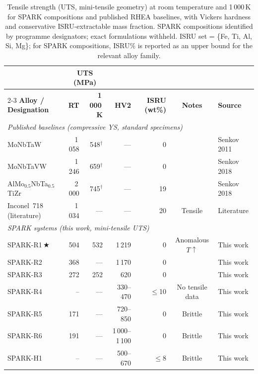 \documentclass[11pt,a4paper]{article}
\begin{document}
\begin{landscape}
\begin{table}[p]
\centering
\caption{Tensile strength (UTS, mini-tensile geometry) at room temperature and 1\,000\,K for SPARK compositions and published RHEA baselines, with Vickers hardness and conservative ISRU-extractable mass fraction. SPARK compositions identified by programme designators; exact formulations withheld. ISRU set = \{Fe, Ti, Al, Si, Mg\}; for SPARK compositions, ISRU\% is reported as an upper bound for the relevant alloy family.}
\label{tab:ys_comparison}
\footnotesize
\begin{tabular}{lrrrrcl}
\toprule
& \multicolumn{2}{c}{\textbf{UTS (MPa)}} & & & & \\
\cmidrule(lr){2-3}
\textbf{Alloy / Designation} &
  \textbf{RT} &
  \textbf{1\,000\,K} &
  \textbf{HV2} &
  \textbf{ISRU (wt\%)} &
  \textbf{Notes} &
  \textbf{Source} \\
\midrule
\multicolumn{7}{l}{\textit{Published baselines (compressive YS, standard specimens)}} \\
MoNbTaW                          & 1\,058 & 548$^\dagger$  & --- & 0  & & Senkov 2011 \\
MoNbTaVW                         & 1\,246 & 659$^\dagger$  & --- & 0  & & Senkov 2018 \\
AlMo$_{0.5}$NbTa$_{0.5}$TiZr    & 2\,000 & 745$^\dagger$  & --- & 19 & & Senkov 2018 \\
Inconel~718 (literature)         & 1\,034 & ---           & --- & 20 & Tensile & Literature \\
\midrule
\multicolumn{7}{l}{\textit{SPARK systems (this work, mini-tensile UTS)}} \\
SPARK-R1\,$\bigstar$  &  504 & 532   & 1\,219     & 0     & Anomalous $T\uparrow$ & This work \\
SPARK-R2              &  368 & ---  & 1\,170     & 0     & & This work \\
SPARK-R3              &  272 & 252   &   620      & 0     & & This work \\
SPARK-R4              &  --& ---  & 330--470   & $\leq$10 & No tensile data & This work \\
SPARK-R5              &  171 & ---  & 720--850   & 0     & Brittle & This work \\
SPARK-R6              &  191 & ---  & 1\,000--1\,100 & 0 & Brittle & This work \\
SPARK-H1              &  --& ---  & 500--670   & $\leq$8 & Brittle & This work \\

\end{tabular}
\end{table}
\end{landscape}
\end{document}
